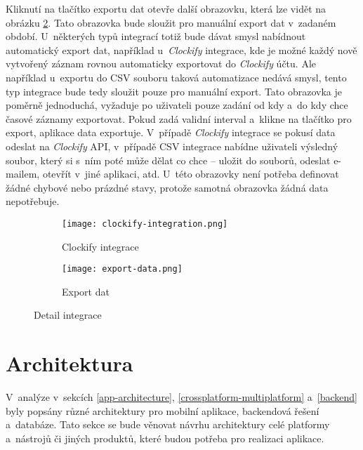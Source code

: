 Kliknutí na tlačítko exportu dat otevře další obrazovku, která lze vidět na obrázku \ref{fig:export-data}. Tato obrazovka bude sloužit pro manuální export dat v~zadaném období. U~některých typů integrací totiž bude dávat smysl nabídnout automatický export dat, například u~\emph{Clockify} integrace, kde je možné každý nově vytvořený záznam rovnou automaticky exportovat do \emph{Clockify} účtu. Ale například u~exportu do CSV souboru taková automatizace nedává smysl, tento typ integrace bude tedy sloužit pouze pro manuální export. Tato obrazovka je poměrně jednoduchá, vyžaduje po uživateli pouze zadání od kdy a~do kdy chce časové záznamy exportovat. Pokud zadá validní interval a~klikne na tlačítko pro export, aplikace data exportuje. V~případě \emph{Clockify} integrace se pokusí data odeslat na \emph{Clockify} API, v~případě CSV integrace nabídne uživateli výsledný soubor, který si s~ním poté může dělat co chce – uložit do souborů, odeslat e-mailem, otevřít v~jiné aplikaci, atd. U~této obrazovky není potřeba definovat žádné chybové nebo prázdné stavy, protože samotná obrazovka žádná data nepotřebuje.

\begin{figure}[h]
    \centering
    \begin{subfigure}[b]{0.4\textwidth}
		\centering
		\texttt{[image: clockify-integration.png]}
		\caption{Clockify integrace}
		\label{fig:clockify-integration}
	\end{subfigure}
	\hspace{2cm}
	\begin{subfigure}[b]{0.4\textwidth}
		\centering
		\texttt{[image: export-data.png]}
		\caption{Export dat}
		\label{fig:export-data}
	\end{subfigure}
	\caption{Detail integrace}
	\label{fig:integration-detail}
\end{figure}

\section{Architektura}

V~analýze v~sekcích \ref{app-architecture}, \ref{crossplatform-multiplatform} a~\ref{backend} byly popsány různé architektury pro mobilní aplikace, backendová řešení a~databáze. Tato sekce se bude věnovat návrhu architektury celé platformy a~nástrojů či jiných produktů, které budou potřeba pro realizaci aplikace.

